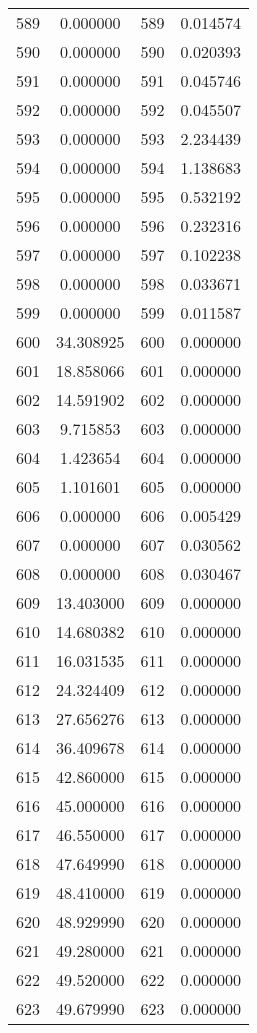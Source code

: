 \documentclass[12pt]{article}
\begin{document}
\begin{longtable}{@{}cccc@{}}
589 & 0.000000 & 589 & 0.014574 \\
590 & 0.000000 & 590 & 0.020393 \\
591 & 0.000000 & 591 & 0.045746 \\
592 & 0.000000 & 592 & 0.045507 \\
593 & 0.000000 & 593 & 2.234439 \\
594 & 0.000000 & 594 & 1.138683 \\
595 & 0.000000 & 595 & 0.532192 \\
596 & 0.000000 & 596 & 0.232316 \\
597 & 0.000000 & 597 & 0.102238 \\
598 & 0.000000 & 598 & 0.033671 \\
599 & 0.000000 & 599 & 0.011587 \\
600 & 34.308925 & 600 & 0.000000 \\
601 & 18.858066 & 601 & 0.000000 \\
602 & 14.591902 & 602 & 0.000000 \\
603 & 9.715853 & 603 & 0.000000 \\
604 & 1.423654 & 604 & 0.000000 \\
605 & 1.101601 & 605 & 0.000000 \\
606 & 0.000000 & 606 & 0.005429 \\
607 & 0.000000 & 607 & 0.030562 \\
608 & 0.000000 & 608 & 0.030467 \\
609 & 13.403000 & 609 & 0.000000 \\
610 & 14.680382 & 610 & 0.000000 \\
611 & 16.031535 & 611 & 0.000000 \\
612 & 24.324409 & 612 & 0.000000 \\
613 & 27.656276 & 613 & 0.000000 \\
614 & 36.409678 & 614 & 0.000000 \\
615 & 42.860000 & 615 & 0.000000 \\
616 & 45.000000 & 616 & 0.000000 \\
617 & 46.550000 & 617 & 0.000000 \\
618 & 47.649990 & 618 & 0.000000 \\
619 & 48.410000 & 619 & 0.000000 \\
620 & 48.929990 & 620 & 0.000000 \\
621 & 49.280000 & 621 & 0.000000 \\
622 & 49.520000 & 622 & 0.000000 \\
623 & 49.679990 & 623 & 0.000000 \\

\end{longtable}
\end{document}
